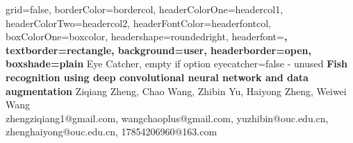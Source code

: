 \documentclass[a0paper,portrait]{baposter}
\begin{document}
\begin{poster}{
	grid=false,
	borderColor=bordercol,
	headerColorOne=headercol1,
	headerColorTwo=headercol2,
	headerFontColor=headerfontcol,
	boxColorOne=boxcolor,
	headershape=roundedright,
	headerfont=\Large\sf\bf,
	textborder=rectangle,
	background=user,
	headerborder=open,
  boxshade=plain
}
{
	Eye Catcher, empty if option eyecatcher=false - unused
}
{\sf\bf
	Fish recognition using deep convolutional neural network and data augmentation
}
{
	\vspace{1em} Ziqiang Zheng, Chao Wang, Zhibin Yu, Haiyong Zheng, Weiwei Wang\\
	{\smaller zhengziqiang1@gmail.com, wangchaoplus@gmail.com, yuzhibin@ouc.edu.cn, zhenghaiyong@ouc.edu.cn, 17854206960@163.com}
}
{

\setlength\fboxsep{0pt}
\setlength\fboxrule{0.5pt}
}



\end{poster}
\end{document}
